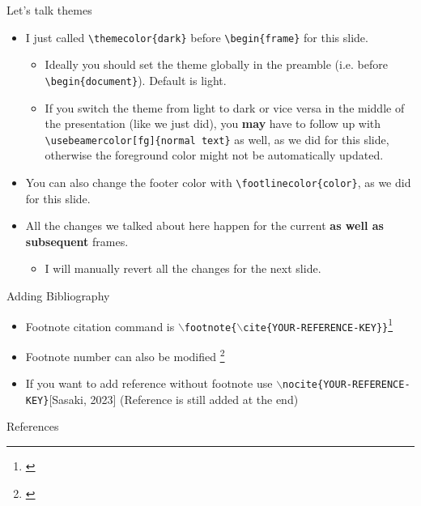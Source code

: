 \documentclass{beamer}
\begin{document}
\begin{frame}[fragile]{Let's talk themes}
\begin{itemize}
\item I just called \verb|\themecolor{dark}| before \verb|\begin{frame}| for this slide.
\begin{itemize}
    \item Ideally you should set the theme globally in the preamble (i.e. before \verb|\begin{document}|). Default is light.
    \item If you switch the theme from light to dark or vice versa in the middle of the presentation (like we just did), you \textbf{may} have to follow up with \verb|\usebeamercolor[fg]{normal text}| as well, as we did for this slide, otherwise the foreground color might not be automatically updated.
\end{itemize}
\item You can also change the footer color with \verb|\footlinecolor{color}|, as we did for this slide.
\item All the changes we talked about here happen for the current \textbf{as well as subsequent} frames.
\begin{itemize}
    \item I will manually revert all the changes for the next slide.
\end{itemize}
\end{itemize}
\end{frame}


\begin{frame}{Adding Bibliography}

    \begin{itemize}
        \item Footnote citation command is \texttt{$\backslash$footnote\{$\backslash$cite\{YOUR-REFERENCE-KEY\}\}}\footnote[1]{\cite{Sasaki.Lightsey.2022}}
        \item Footnote number can also be modified \footnote[3]{\cite{Sasaki.Lightsey.2022}}
        \item If you want to add reference without footnote use \texttt{$\backslash$nocite\{YOUR-REFERENCE-KEY\}}[Sasaki, 2023]\nocite{Sasaki.Lightsey.2023} (Reference is still added at the end)
    \end{itemize}
\end{frame}

\begin{frame}{References}
    \AtNextBibliography{\footnotesize}
    {
    \printbibliography[heading=none]
    }
\end{frame}
\end{document}
